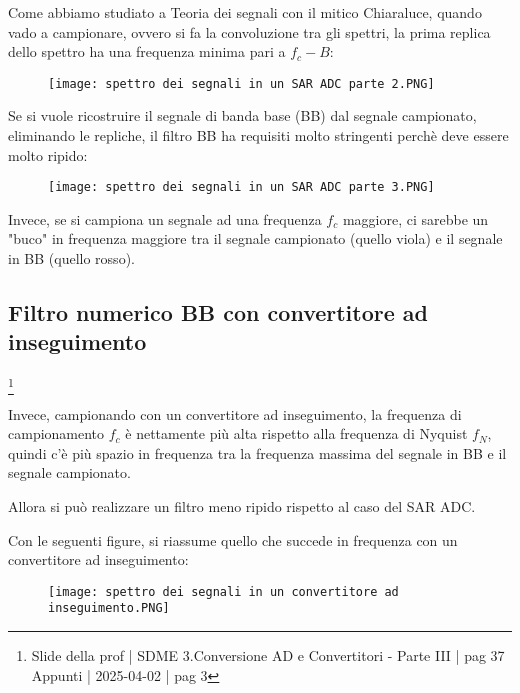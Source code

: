 Come abbiamo studiato a Teoria dei segnali con il mitico Chiaraluce, quando vado a campionare, 
ovvero si fa la convoluzione tra gli spettri, la prima replica dello spettro ha una frequenza minima pari a $f_c - B$: 

\begin{figure}[h]
    \centering
    \texttt{[image: spettro dei segnali in un SAR ADC parte 2.PNG]}
\end{figure}

Se si vuole ricostruire il segnale di banda base (BB) dal segnale campionato, eliminando le repliche, 
il filtro BB ha requisiti molto stringenti perchè deve essere molto ripido: 

\begin{figure}[h]
    \centering
    \texttt{[image: spettro dei segnali in un SAR ADC parte 3.PNG]}
\end{figure}

Invece, se si campiona un segnale ad una frequenza $f_c$ maggiore, ci sarebbe un "buco" in frequenza maggiore tra il segnale campionato (quello viola) e il segnale in BB (quello rosso). \newline 

\newpage 

\subsection{Filtro numerico BB con convertitore ad inseguimento}
\footnote{Slide della prof | SDME 3.Conversione AD e Convertitori - Parte III | pag 37 \\  
Appunti | 2025-04-02 | pag 3 }

Invece, campionando con un convertitore ad inseguimento, la frequenza di campionamento $f_c$ è nettamente più alta rispetto alla frequenza di Nyquist $f_N$, 
quindi c'è più spazio in frequenza tra la frequenza massima del segnale in BB e il segnale campionato. \newline 

Allora si può realizzare un filtro meno ripido rispetto al caso del SAR ADC. \newline 

Con le seguenti figure, si riassume quello che succede in frequenza con un convertitore ad inseguimento: 

\begin{figure}[h]
    \centering
    \texttt{[image: spettro dei segnali in un convertitore ad inseguimento.PNG]}
\end{figure}

